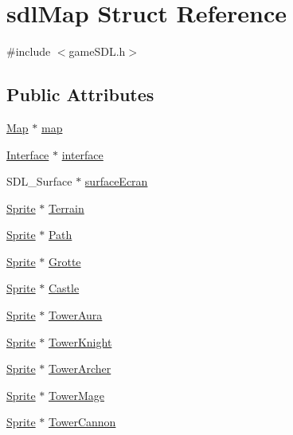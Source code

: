 \hypertarget{structsdl_map}{}\section{sdl\+Map Struct Reference}
\label{structsdl_map}


{\ttfamily \#include $<$game\+S\+D\+L.\+h$>$}

\subsection*{Public Attributes}
\begin{DoxyCompactItemize}
\item 
\hyperlink{map_8h_af9824e0a3cac785d07b43c5265fddd5a}{Map} $\ast$ \hyperlink{structsdl_map_a45740d4484afe0a6d1fe87d7fe9eb74f}{map}
\item 
\hyperlink{interface_8h_a2bc6028823fa0c49a7d38abca6364e6f}{Interface} $\ast$ \hyperlink{structsdl_map_a759be5e12b384cc485d0d9198b60aab5}{interface}
\item 
S\+D\+L\+\_\+\+Surface $\ast$ \hyperlink{structsdl_map_a05ce72876b384ab36d2bc2e78cbb4d2e}{surface\+Ecran}
\item 
\hyperlink{struct_sprite}{Sprite} $\ast$ \hyperlink{structsdl_map_abdb954fdbc6c1560425b8131a1333644}{Terrain}
\item 
\hyperlink{struct_sprite}{Sprite} $\ast$ \hyperlink{structsdl_map_aadc6c5b4f6c6325cca31f1b439d41f39}{Path}
\item 
\hyperlink{struct_sprite}{Sprite} $\ast$ \hyperlink{structsdl_map_ace0a514e63e0cfefd14580b551fb36cd}{Grotte}
\item 
\hyperlink{struct_sprite}{Sprite} $\ast$ \hyperlink{structsdl_map_a158977a54df1d156983f52481a657cb8}{Castle}
\item 
\hyperlink{struct_sprite}{Sprite} $\ast$ \hyperlink{structsdl_map_a72869f765a524d7ce53dac7e30a87344}{Tower\+Aura}
\item 
\hyperlink{struct_sprite}{Sprite} $\ast$ \hyperlink{structsdl_map_a17cb76e625d269d401a1e878436377dd}{Tower\+Knight}
\item 
\hyperlink{struct_sprite}{Sprite} $\ast$ \hyperlink{structsdl_map_a1a34a71be9d9e2b9e3f9c9dbb6ecbda7}{Tower\+Archer}
\item 
\hyperlink{struct_sprite}{Sprite} $\ast$ \hyperlink{structsdl_map_aedc2a06f1f47c80edc6b7510830202d6}{Tower\+Mage}
\item 
\hyperlink{struct_sprite}{Sprite} $\ast$ \hyperlink{structsdl_map_af8621dd16aaf2811edb2cd5b667de435}{Tower\+Cannon}

\end{DoxyCompactItemize}
